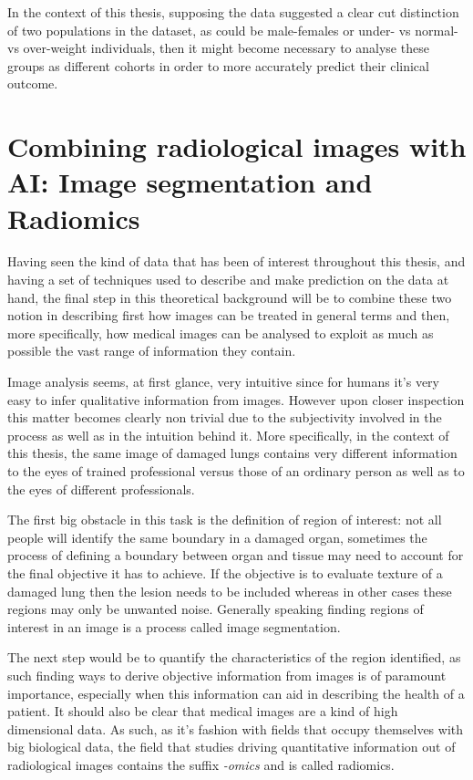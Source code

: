 In the context of this thesis, supposing the data suggested a clear cut distinction of two populations in the dataset, as could be male-females or under- vs  normal- vs over-weight individuals, then it might become necessary to analyse these groups as different  cohorts in order to more accurately predict their clinical outcome.


\section{Combining radiological images  with AI: Image segmentation and Radiomics}
Having seen the kind of data that has been of interest throughout this thesis, and having a set of techniques used to describe and make prediction on the data at hand, the final step in this theoretical background will be to combine these two notion in describing first how images can be treated in general terms and then, more specifically, how medical images can be analysed to exploit as much as possible the vast range of information they contain.

Image analysis seems, at first glance, very intuitive since for humans it's very easy to infer qualitative information from images. However upon closer inspection this matter becomes clearly non trivial due to the subjectivity involved in the process as well as in the intuition behind it. More specifically, in the context of this thesis, the same image of damaged lungs contains very different information to the eyes of trained professional versus those of an ordinary person as well as to the eyes of different professionals.

The first big obstacle in this task is the definition of region of interest: not all people will identify the same boundary in a damaged organ, sometimes the process of defining a boundary between organ and tissue may need to account for the final objective it has to achieve. If the objective is to evaluate texture of a damaged lung then the lesion needs to be included whereas in other cases these regions may only be unwanted noise. Generally speaking finding regions of interest in an image is a process called image segmentation.

The next step would be to quantify the characteristics of the region identified, as such finding ways to derive objective information from images is of paramount importance, especially when this information can aid in describing the health of a patient. It should also be clear that medical images are a kind of high dimensional data. As such, as it's fashion with fields that occupy themselves with big biological data, the field that studies driving quantitative information out of radiological images contains the suffix \textit{-omics} and is called radiomics.

